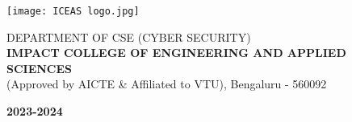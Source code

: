 \documentclass[12pt, a4paper]{report}
\begin{document}
\begin{titlepage}
\begin{center}
\texttt{[image: ICEAS logo.jpg]}\\
\vspace{0.1in}

{\small DEPARTMENT OF CSE (CYBER SECURITY)}\\
\textbf{IMPACT COLLEGE OF ENGINEERING AND APPLIED SCIENCES}\\
{\small (Approved by AICTE & Affiliated to VTU), Bengaluru - 560092}\\
\vspace{0.2in}

{\large \textbf{2023-2024}}

\end{center}
\end{titlepage}
\end{document}
